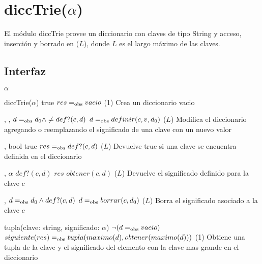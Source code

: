 \section{diccTrie($\alpha$)}

El módulo diccTrie provee un diccionario con claves de tipo String y acceso, inserción y borrado en \bigo($L$), donde $L$ es el largo máximo de las claves.

\subsection{Interfaz}

\begin{iparamformales}{$\alpha$}

\end{iparamformales}

\iusa{}
\ioperaciones

{}
{diccTrie($\alpha$)}
{true}
{$res =_{\mathrm{obs}} vacio$}
{\bigo(1)}
{}
{Crea un diccionario vacio}

{   ,
    ,
    }
{}
{$d =_{\mathrm{obs}} d_0 \land \neq def?(c, d)$}
{$d =_{\mathrm{obs}} definir(c, v, d_0)$}
{\bigo($L$)}
{Modifica el diccionario agregando o reemplazando el significado de una clave 
    con un nuevo valor}

{   ,
    }
{bool}
{true}
{$res =_{\mathrm{obs}} def?(c, d)$}
{\bigo($L$)}
{}
{Devuelve true si una clave se encuentra definida en el diccionario}

{   ,
    }
{$\alpha$}
{$def?(c, d)$}
{$res$ \igobs $obtener(c, d)$}
{\bigo($L$)}
{}
{Devuelve el significado definido para la clave $c$}

{   ,
    }
{}
{$d =_{\mathrm{obs}} d_0 \land def?(c, d)$}
{$d =_{\mathrm{obs}} borrar(c, d_0)$}
{\bigo($L$)}
{}
{Borra el significado asociado a la clave $c$}

{   }
{tupla(clave: string, significado: $\alpha$)}
{$\neg (d =_{\mathrm{obs}} vacio)$}
{$siguiente(res) =_{\mathrm{obs}} tupla(maximo(d), obtener(maximo(d)))$}
{\bigo(1)}
{}
{Obtiene una tupla de la clave y el significado del elemento con la clave 
    mas grande en el diccionario}

